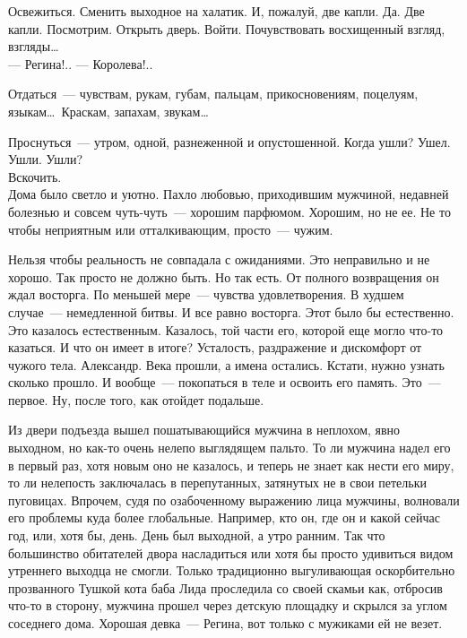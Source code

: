 Освежиться. Сменить выходное на халатик. И, пожалуй, две капли. Да. Две капли. 
Посмотрим. Открыть дверь. Войти. Почувствовать восхищенный взгляд, взгляды\ldots\\
--- Регина!..
--- Королева!..

Отдаться~--- чувствам, рукам, губам, пальцам, прикосновениям, поцелуям, 
языкам\ldots\ 
Краскам, запахам, звукам\ldots

Проснуться~--- утром, одной, разнеженной и опустошенной. Когда ушли? Ушел. 
Ушли. 
Ушли?\\

Вскочить.\\

Дома было светло и уютно. Пахло любовью, приходившим мужчиной, недавней болезнью 
и совсем чуть-чуть~--- хорошим парфюмом. Хорошим, но не ее. Не то чтобы 
неприятным 
или отталкивающим, просто~--- чужим.

\newpage

Нельзя чтобы реальность не совпадала с ожиданиями. Это неправильно и не хорошо. 
Так просто не должно быть. Но так есть. От полного возвращения он ждал восторга. 
По меньшей мере~--- чувства удовлетворения. В худшем случае~--- немедленной 
битвы. 
И все равно восторга. Этот было бы естественно. Это казалось естественным. 
Казалось, той части его, которой 
еще могло что-то казаться. И что он имеет в итоге? Усталость, раздражение и 
дискомфорт от чужого тела. Александр. Века прошли, а имена остались. Кстати, 
нужно узнать сколько прошло. И вообще~--- покопаться в теле и освоить его 
память. 
Это~--- первое. Ну, после того, как отойдет подальше.

Из двери подъезда вышел пошатывающийся мужчина в неплохом, явно выходном, но 
как-то очень нелепо выглядящем пальто. То ли мужчина надел его в первый раз, 
хотя новым оно не казалось, и теперь не знает как нести его миру, то ли 
нелепость заключалась в перепутанных, затянутых не в свои петельки пуговицах. 
Впрочем, судя по озабоченному выражению лица мужчины, волновали его проблемы 
куда более глобальные. Например, кто он, где он и какой сейчас год, или, хотя 
бы, день. День был выходной, а утро ранним. Так что большинство обитателей двора 
насладиться или хотя бы просто удивиться видом утреннего выходца не смогли. 
Только традиционно выгуливающая оскорбительно прозванного Тушкой кота баба Лида 
проследила со своей скамьи как, отбросив что-то в сторону, мужчина прошел через 
детскую площадку и скрылся за углом соседнего дома. Хорошая девка~--- Регина, 
вот 
только с мужиками ей не везет.


